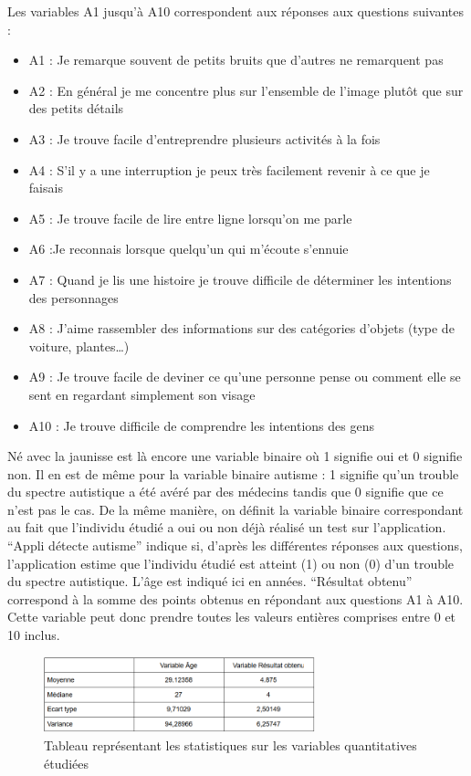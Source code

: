 \documentclass[12,french]{report}
\begin{document}
Les variables A1 jusqu’à A10 correspondent aux réponses aux questions suivantes :
\begin{itemize}[label=\textbullet]
	\item A1 : Je remarque souvent de petits bruits que d’autres ne 				remarquent pas
	\item A2 : En général je me concentre plus sur l’ensemble de l’image 			plutôt que sur des petits détails
	\item A3 : Je trouve facile d’entreprendre plusieurs activités à la fois
	\item A4 : S’il y a une interruption je peux très facilement revenir à ce que je faisais
	\item A5 : Je trouve facile de lire entre ligne lorsqu’on me parle
	\item A6 :Je reconnais lorsque quelqu’un qui m’écoute s’ennuie
	\item A7 : Quand je lis une histoire je trouve difficile de déterminer 			les intentions des personnages
	\item A8 : J’aime rassembler des informations sur des catégories 				d’objets (type de voiture, plantes…)
	\item A9 : Je trouve facile de deviner ce qu’une personne pense ou 				comment elle se sent en regardant simplement son visage
	\item A10 : Je trouve difficile de comprendre les intentions des gens
\end{itemize}
\vspace{0.5cm}

	Né avec la jaunisse est là encore une variable binaire où 1 signifie oui et 0 signifie non. Il en est de même pour la variable binaire autisme : 1 signifie qu’un trouble du spectre autistique a été avéré par des médecins tandis que 0 signifie que ce n’est pas le cas. De la même manière, on définit la variable binaire correspondant au fait que l’individu étudié a oui ou non déjà réalisé un test sur l’application. “Appli détecte autisme” indique si, d’après les différentes réponses aux questions, l’application estime que l’individu étudié est atteint (1) ou non (0) d’un trouble du spectre autistique. L’âge est indiqué ici en années. “Résultat obtenu” correspond à la somme des points obtenus en répondant aux questions A1 à A10. Cette variable peut donc prendre toutes les valeurs entières comprises entre 0 et 10 inclus.\\

\begin{figure}
	\centering
	\includegraphics[width=0.7\textwidth]{./Images/2}
	\caption{Tableau représentant les statistiques sur les variables quantitatives étudiées}
\end{figure}
\end{document}
